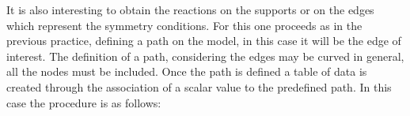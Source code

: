 \documentclass[english,a4paper,12pt]{article}
\begin{document}
It is also interesting to obtain the reactions on the supports or on the edges which represent the symmetry conditions.
For this one proceeds as in the previous practice, defining a path on the model, in this case it will be the edge of interest.
The definition of a path, considering the edges may be curved in general, all the nodes must be included.
Once the path is defined a table of data is created through the association of a scalar value to the predefined path.
In this case the procedure is as follows:
\end{document}
